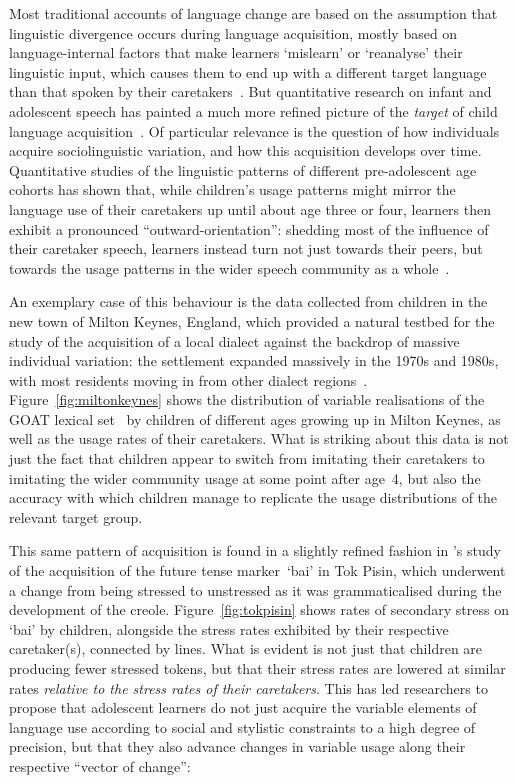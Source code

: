 
Most traditional accounts of language change are based on the assumption that linguistic divergence occurs during language acquisition, mostly based on language-internal factors that make learners `mislearn' or `reanalyse' their linguistic input, which causes them to end up with a different target language than that spoken by their caretakers~\citep[see e.g.][]{Salmons2013}. But quantitative research on infant and adolescent speech has painted a much more refined picture of the \emph{target} of child language acquisition~\citep{Labov1989,Labov2012}. Of particular relevance is the question of how individuals acquire sociolinguistic variation, and how this acquisition develops over time. Quantitative studies of the linguistic patterns of different pre-adolescent age cohorts has shown that, while children's usage patterns might mirror the language use of their caretakers up until about age three or four, learners then exhibit a pronounced ``outward-orientation'': shedding most of the influence of their caretaker speech, learners instead turn not just towards their peers, but towards the usage patterns in the wider speech community as a whole~\citep{Labov2014}. %

An exemplary case of this behaviour is the data collected from children in the new town of Milton Keynes, England, which provided a natural testbed for the study of the acquisition of a local dialect against the backdrop of massive individual variation: the settlement expanded massively in the 1970s and 1980s, with most residents moving in from other dialect regions~\citep{Kerswill1994,Williams1999}.
Figure~\ref{fig:miltonkeynes} shows the distribution of variable realisations of the \textsc{GOAT} lexical set~\citep[the vowel in English `goat', `boat', `fold' etc., see][]{Wells1982} by children of different ages growing up in Milton Keynes, as well as the usage rates of their caretakers. What is striking about this data is not just the fact that children appear to switch from imitating their caretakers to imitating the wider community usage at some point after age~4, but also the accuracy with which children manage to replicate the usage distributions of the relevant target group.

This same pattern of acquisition is found in a slightly refined fashion in \citet{Sankoff1973}'s study of the acquisition of the future tense marker~`bai' in Tok Pisin, which underwent a change from being stressed to unstressed as it was grammaticalised during the development of the creole. Figure~\ref{fig:tokpisin} shows rates of secondary stress on `bai' by children, alongside the stress rates exhibited by their respective caretaker(s), connected by lines. What is evident is not just that children are producing fewer stressed tokens, but that their stress rates are lowered at similar rates \emph{relative to the stress rates of their caretakers}. This has led researchers to propose that adolescent learners do not just acquire the variable elements of language use according to social and stylistic constraints to a high degree of precision, but that they also advance changes in variable usage along their respective ``vector of change'':

